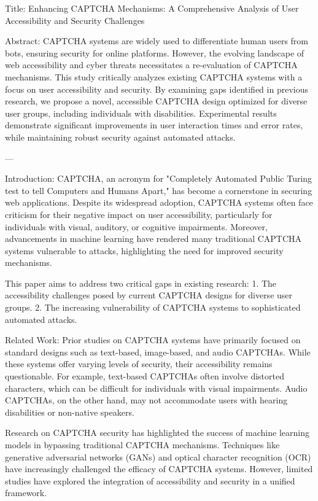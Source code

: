 Title: Enhancing CAPTCHA Mechanisms: A Comprehensive Analysis of User Accessibility and Security Challenges  

Abstract:  
CAPTCHA systems are widely used to differentiate human users from bots, ensuring security for online platforms. However, the evolving landscape of web accessibility and cyber threats necessitates a re-evaluation of CAPTCHA mechanisms. This study critically analyzes existing CAPTCHA systems with a focus on user accessibility and security. By examining gaps identified in previous research, we propose a novel, accessible CAPTCHA design optimized for diverse user groups, including individuals with disabilities. Experimental results demonstrate significant improvements in user interaction times and error rates, while maintaining robust security against automated attacks.  

---

Introduction:  
CAPTCHA, an acronym for "Completely Automated Public Turing test to tell Computers and Humans Apart," has become a cornerstone in securing web applications. Despite its widespread adoption, CAPTCHA systems often face criticism for their negative impact on user accessibility, particularly for individuals with visual, auditory, or cognitive impairments. Moreover, advancements in machine learning have rendered many traditional CAPTCHA systems vulnerable to attacks, highlighting the need for improved security mechanisms.  

This paper aims to address two critical gaps in existing research:  
1. The accessibility challenges posed by current CAPTCHA designs for diverse user groups.  
2. The increasing vulnerability of CAPTCHA systems to sophisticated automated attacks.  

Related Work:  
Prior studies on CAPTCHA systems have primarily focused on standard designs such as text-based, image-based, and audio CAPTCHAs. While these systems offer varying levels of security, their accessibility remains questionable. For example, text-based CAPTCHAs often involve distorted characters, which can be difficult for individuals with visual impairments. Audio CAPTCHAs, on the other hand, may not accommodate users with hearing disabilities or non-native speakers.  

Research on CAPTCHA security has highlighted the success of machine learning models in bypassing traditional CAPTCHA mechanisms. Techniques like generative adversarial networks (GANs) and optical character recognition (OCR) have increasingly challenged the efficacy of CAPTCHA systems. However, limited studies have explored the integration of accessibility and security in a unified framework.  

